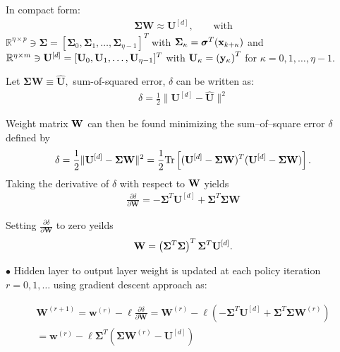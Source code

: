 \documentclass{beamer}
\begin{document}
\begin{frame}
  In compact form:
  \begin{align*}
    \bm{\Sigma}\mathbf{W} \approx  \mathbf{U}^{[d]},\qquad\text{with}
  \end{align*}
  $\mathbb{R}^{\eta\times p}\ni \bm{\Sigma} = [\bm{\Sigma}_0,\bm{\Sigma}_1,\ldots,\bm{\Sigma}_{\eta -1}]^T$ with $\bm{\Sigma}_\kappa = \bm{\sigma}^T({\bf x}_{k+\kappa})$ and $\mathbb{R}^{\eta\times m}\ni {\bf U}^{[d]} = [{\bf U}_0,{\bf U}_1,\ldots, {\bf U}_{\eta-1}]^T$ with ${\bf U}_\kappa = \left({\bf y}_{\kappa}\right)^T$ for $\kappa = 0,1,\ldots,\eta-1.$

  Let $\bm{\Sigma}\mathbf{W}\equiv \hat{\mathbf{U}},$ sum-of-squared error, $\delta$ can be written as:
  \begin{align*}
    \delta = \frac{1}{2}\|\mathbf{U}^{[d]} - \hat{\mathbf{U}}\|^2
  \end{align*}

Weight matrix ${\bf W}$ can then be found minimizing the sum--of--square error $\delta$ defined by %
%
\begin{align*}
  \delta = \frac{1}{2}\|{\bf U}^{[d]} - \bm{\Sigma} {\bf W}\|^2  = \frac{1}{2}\mathrm{Tr}\left[({\bf U}^{[d]} - \bm{\Sigma} {\bf W})^T({\bf U}^{[d]} - \bm{\Sigma} {\bf W})\right].
\end{align*}
%
Taking the derivative of $\delta$ with respect to ${\bf W}$ yields 
%
\begin{align}
  \frac{\partial\delta}{\partial\mathbf{W}} = - \bm{\Sigma}^T\mathbf{U}^{[d]} + \bm{\Sigma}^T \bm{\Sigma}\mathbf{W}
  \label{eq:actorWeightsGradient}
\end{align}
%

\end{frame}

\begin{frame}


  Setting $\frac{\partial\delta}{\partial\mathbf{W}}$ to zero yeilds
  \begin{align*}
    {\bf W} = \left(\bm{\Sigma}^T\bm{\Sigma}\right)^T\bm{\Sigma}^T{\bf U}^{[d]}.
  \end{align*}
  
$\bullet$ Hidden layer to output layer weight is updated at each policy iteration $r=0,1,\ldots$ using gradient descent approach as:

\begin{multline}
  \mathbf{W}^{(r+1)} = \mathbf{w}^{(r)} - \ell\frac{\partial\delta}{\partial\mathbf{W}}= \mathbf{W}^{(r)} - \ell\left(-\bm{\Sigma}^T\mathbf{U}^{[d]} + \bm{\Sigma}^T \bm{\Sigma}\mathbf{W}^{(r)}\right)\\
  = \mathbf{w}^{(r)}-\ell \bm{\Sigma}^T\left(\bm{\Sigma}\mathbf{W}^{(r)} - \mathbf{U}^{[d]}\right)
  \label{eq:actorWeightUpdate}
\end{multline}

\end{frame}
\end{document}
